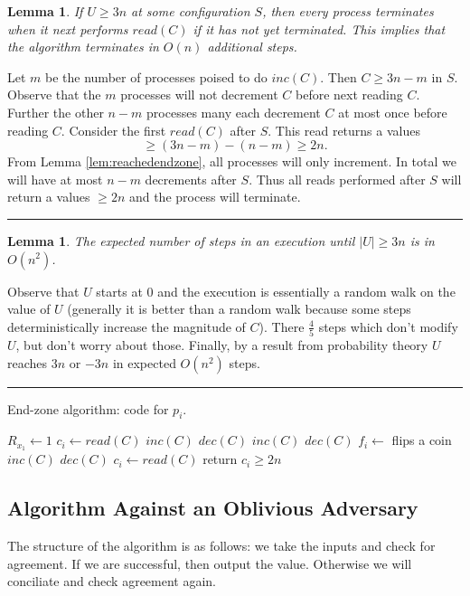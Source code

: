 \documentclass[twoside]{article}
\newtheorem{lemma}[theorem]{Lemma}
\newenvironment{proof}{{\bf Proof:}}{\hfill\rule{2mm}{2mm}}
\begin{document}
\begin{lemma}
If $U \geq 3n$ at some configuration $S$, then every process terminates when it next performs $read(C)$ if it has not yet terminated. This implies that the algorithm terminates in $O(n)$ additional steps. 
\end{lemma}
\begin{proof}
Let $m$ be the number of processes poised to do $inc(C)$. Then $C \geq 3n-m$ in $S$. Observe that the $m$ processes will not decrement $C$ before next reading $C$. Further the other $n-m$ processes many each decrement $C$ at most once before reading $C$. Consider the first $read(C)$ after $S$. This read returns a values
\[\geq (3n-m) - (n-m) \geq 2n.\]
From Lemma \ref{lem:reachedendzone}, all processes will only increment. In total we will have at most $n-m$ decrements after $S$. Thus all reads performed after $S$ will return a values $\geq 2n$ and the process will terminate. 
\end{proof}

\begin{lemma}
The expected number of steps in an execution until $|U| \geq 3n$ is in $O(n^2)$.
\end{lemma}
\begin{proof}
Observe that $U$ starts at $0$ and the execution is essentially a random walk on the value of $U$ (generally it is better than a random walk because some steps deterministically increase the magnitude of $C$). There $\frac{4}{5}$ steps which don't modify $U$, but don't worry about those. Finally, by a result from probability theory $U$ reaches $3n$ or $-3n$ in expected $O(n^2)$ steps. 
\end{proof}

\begin{algorithm}[ht]
	\caption{End-zone algorithm: code for $p_i$.}
    \label{pseudocode:endzone}
    \begin{algorithmic}[1]
	\State $R_{x_1} \leftarrow 1$
	\State $c_i \leftarrow read(C)$
			\State $inc(C)$
			\State $dec(C)$
			\State $inc(C)$
			\State $dec(C)$
		\Else
			\State $f_i \leftarrow$ flips a coin
				\State $inc(C)$
			\Else
				\State $dec(C)$
			\EndIf
		\EndIf
		$c_i \leftarrow read(C)$
	\EndWhile
	\State return $c_i \geq 2n$
	\end{algorithmic}
\end{algorithm}

\subsection{Algorithm Against an Oblivious Adversary}
The structure of the algorithm is as follows: we take the inputs and check for agreement. If we are successful, then output the value. Otherwise we will conciliate and check agreement again. 
\end{document}

